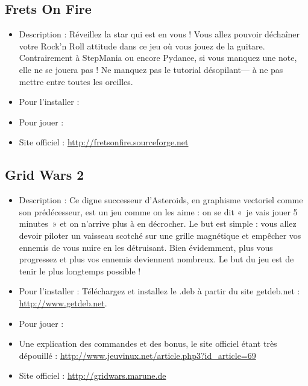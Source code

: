 \subsection{Frets On Fire}
\begin{itemize}
\begingroup
{}
\item Description : Réveillez la star qui est en vous ! Vous allez pouvoir déchaîner votre Rock'n Roll attitude dans ce jeu où vous jouez de la guitare. Contrairement à StepMania ou encore Pydance, si vous manquez une note, elle ne se jouera pas ! Ne manquez pas le tutorial désopilant--- à ne pas mettre entre toutes les oreilles.{\par}
\endgroup
\item Pour l'installer : 
\item Pour jouer : 
\item Site officiel : \url{http://fretsonfire.sourceforge.net}{\par}
\end{itemize}
\subsection{Grid Wars 2}
\begin{itemize}
\begingroup
{}
\item Description : Ce digne successeur d'Asteroids, en graphisme vectoriel comme son prédécesseur, est un jeu comme on les aime : on se dit «~je vais jouer 5 minutes~» et on n'arrive plus à en décrocher. Le but est simple : vous allez devoir piloter un vaisseau scotché sur une grille magnétique et empêcher vos ennemis de vous nuire en les détruisant. Bien évidemment, plus vous progressez et plus vos ennemis deviennent nombreux. Le but du jeu est de tenir le plus longtemps possible !{\par}
\endgroup
\item Pour l'installer : Téléchargez et installez le .deb à partir du site getdeb.net :
\url{http://www.getdeb.net}.{\par}
\item Pour jouer : 
\item Une explication des commandes et des bonus, le site officiel étant très dépouillé : \url{http://www.jeuvinux.net/article.php3?id_article=69}{\par}
\item Site officiel : \url{http://gridwars.marune.de}{\par}
\end{itemize}
